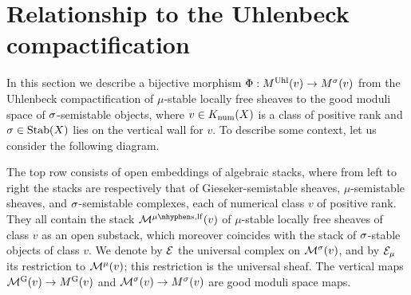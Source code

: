 \documentclass[letterpaper,12pt]{amsart}
\theoremstyle{remark}
\begin{document}

\section{Relationship to the Uhlenbeck compactification}
In this section we describe a bijective morphism $\Phi: M^{\mathrm{Uhl}}(v) \to M^\sigma(v)$ from the Uhlenbeck compactification of $\mu$-stable locally free sheaves to the good moduli space of $\sigma$-semistable objects, where $v \in K_{\mathrm{num}}(X)$ is a class of positive rank and $\sigma \in \operatorname{\mathrm{Stab}}(X)$ lies on the vertical wall for $v$. To describe some context, let us consider the following diagram.

\begin{center}
\end{center}
The top row consists of open embeddings of algebraic stacks, where from left to right the stacks are respectively that of Gieseker-semistable sheaves, $\mu$-semistable sheaves, and $\sigma$-semistable complexes, each of numerical class $v$ of positive rank. They all contain the stack $\sM^{\mu\mhyphen\mathrm{s}, \mathrm{lf}}(v)$ of $\mu$-stable locally free sheaves of class $v$ as an open substack, which moreover coincides with the stack of $\sigma$-stable objects of class $v$. We denote by $\mathcal{E}$ the universal complex on $\mathcal{M}^\sigma(v)$, and by $\mathcal{E}_\mu$ its restriction to $\mathcal{M}^{\mu}(v)$; this restriction is the universal sheaf. The vertical maps $\mathcal{M}^{\mathrm{G}}(v) \to M^{\mathrm{G}}(v)$ and $\mathcal{M}^\sigma(v) \to M^\sigma(v)$ are good moduli space maps.
\end{document}
